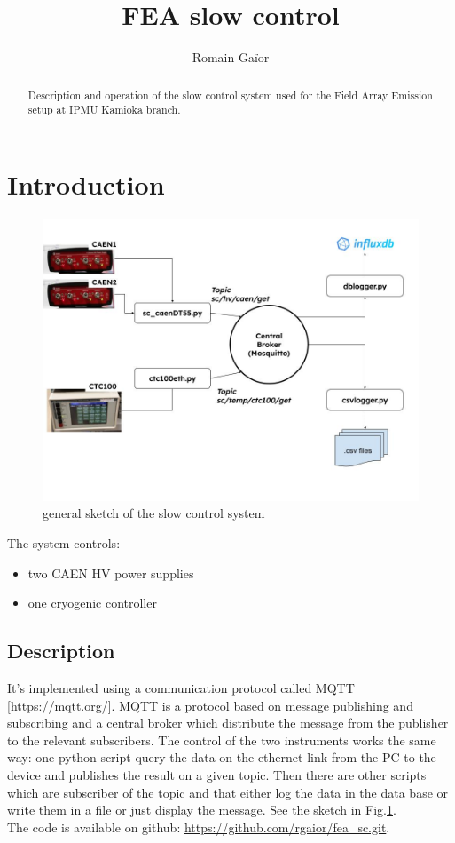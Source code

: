 \documentclass{article}
\title{FEA slow control}
\author{Romain Ga\"ior}
\begin{document}
\maketitle

\begin{abstract}
Description and operation of the slow control system used for the Field Array Emission setup at IPMU Kamioka branch. 
\end{abstract}

\section{Introduction}
\begin{figure}
\centering
\includegraphics[width=0.9\linewidth]{fea_sc.jpg}
\caption{\label{fig:sc}general sketch of the slow control system}
\end{figure}

The system controls:
\begin{itemize}
    \item two CAEN HV power supplies 
    \item one cryogenic controller
\end{itemize}
\subsection{Description}
It's implemented using a communication protocol called MQTT [\url{https://mqtt.org/}]. MQTT is a protocol based on message publishing and subscribing and a central broker which distribute the message from the publisher to the relevant subscribers. The control of the two instruments works the same way: one python script query the data on the ethernet link from the PC to the device and publishes the result on a given topic. Then there are other scripts which are subscriber of the topic and that either log the data in the data base or write them in a file or just display the message. See the sketch in Fig.\ref{fig:sc}.\\
The code is available on github: \url{https://github.com/rgaior/fea_sc.git}.
\end{document}
